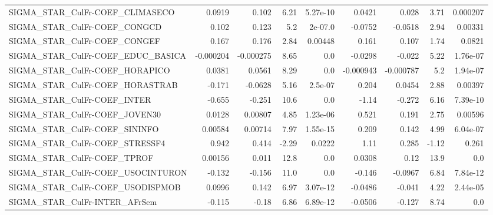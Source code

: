 \begin{tabular}{lrrrrrrrr}
SIGMA\_STAR\_CulFr-COEF\_CLIMASECO       &      0.0919 &        0.102 &    6.21 & 5.27e-10 &     0.0421 &       0.028 &         3.71 &      0.000207 \\
SIGMA\_STAR\_CulFr-COEF\_CONGCD          &       0.102 &        0.123 &     5.2 &  2e-07.0 &    -0.0752 &     -0.0518 &         2.94 &       0.00331 \\
SIGMA\_STAR\_CulFr-COEF\_CONGEF          &       0.167 &        0.176 &    2.84 &  0.00448 &      0.161 &       0.107 &         1.74 &        0.0821 \\
SIGMA\_STAR\_CulFr-COEF\_EDUC\_BASICA     &   -0.000204 &    -0.000275 &    8.65 &      0.0 &    -0.0298 &      -0.022 &         5.22 &      1.76e-07 \\
SIGMA\_STAR\_CulFr-COEF\_HORAPICO        &      0.0381 &       0.0561 &    8.29 &      0.0 &  -0.000943 &   -0.000787 &          5.2 &      1.94e-07 \\
SIGMA\_STAR\_CulFr-COEF\_HORASTRAB       &      -0.171 &      -0.0628 &    5.16 &  2.5e-07 &      0.204 &      0.0454 &         2.88 &       0.00397 \\
SIGMA\_STAR\_CulFr-COEF\_INTER           &      -0.655 &       -0.251 &    10.6 &      0.0 &      -1.14 &      -0.272 &         6.16 &      7.39e-10 \\
SIGMA\_STAR\_CulFr-COEF\_JOVEN30         &      0.0128 &      0.00807 &    4.85 & 1.23e-06 &      0.521 &       0.191 &         2.75 &       0.00596 \\
SIGMA\_STAR\_CulFr-COEF\_SININFO         &     0.00584 &      0.00714 &    7.97 & 1.55e-15 &      0.209 &       0.142 &         4.99 &      6.04e-07 \\
SIGMA\_STAR\_CulFr-COEF\_STRESSF4        &       0.942 &        0.414 &   -2.29 &   0.0222 &       1.11 &       0.285 &        -1.12 &         0.261 \\
SIGMA\_STAR\_CulFr-COEF\_TPROF           &     0.00156 &        0.011 &    12.8 &      0.0 &     0.0308 &        0.12 &         13.9 &           0.0 \\
SIGMA\_STAR\_CulFr-COEF\_USOCINTURON     &      -0.132 &       -0.156 &    11.0 &      0.0 &     -0.146 &     -0.0967 &         6.84 &      7.84e-12 \\
SIGMA\_STAR\_CulFr-COEF\_USODISPMOB      &      0.0996 &        0.142 &    6.97 & 3.07e-12 &    -0.0486 &      -0.041 &         4.22 &      2.44e-05 \\
SIGMA\_STAR\_CulFr-INTER\_AFrSem         &      -0.115 &        -0.18 &    6.86 & 6.89e-12 &    -0.0506 &      -0.127 &         8.74 &           0.0 \\

\end{tabular}
